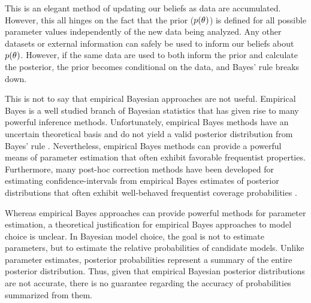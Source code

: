\documentclass[letterpaper,12pt]{article}
\begin{document}
\begin{linenumbers}
This is an elegant method of updating our beliefs as data are accumulated.
However, this all hinges on the fact that the prior ($p(\theta_{})$) is
defined for all possible parameter values independently of the new data being
analyzed.
Any other datasets or external information can safely be used to inform our
beliefs about $p(\theta_{})$.
However, if the same data are used to both inform the prior and calculate the
posterior, the prior becomes conditional on the data, and Bayes' rule breaks
down.

This is not to say that empirical Bayesian approaches are not useful.
Empirical Bayes is a well studied branch of Bayesian statistics that
has given rise to many powerful inference methods.
Unfortunately, empirical Bayes methods have an uncertain theoretical basis and
do not yield a valid posterior distribution from Bayes' rule \citep[e.g.,
empirical Bayesian estimates of the posterior are often too narrow, off-center,
and misshapen;][]{Morris1983,Laird1987,Carlin1990,Efron2013}.
Nevertheless, empirical Bayes methods can provide a powerful means of parameter
estimation that often exhibit favorable frequentist properties.
Furthermore, many post-hoc correction methods have been developed for
estimating confidence-intervals from empirical Bayes estimates of posterior
distributions that often exhibit well-behaved frequentist coverage
probabilities
\citep{Morris1983,Laird1987,Laird1989, Carlin1990,Hwang2009}.

Whereas empirical Bayes approaches can provide powerful methods for parameter
estimation, a theoretical justification for empirical Bayes approaches to model
choice is unclear.
In Bayesian model choice, the goal is not to estimate parameters, but to
estimate the relative probabilities of candidate models.
Unlike parameter estimates, posterior probabilities represent a summary of the
entire posterior distribution.
Thus, given that empirical Bayesian posterior distributions are not accurate,
there is no guarantee regarding the accuracy of probabilities summarized from
them.


\end{linenumbers}
\end{document}
